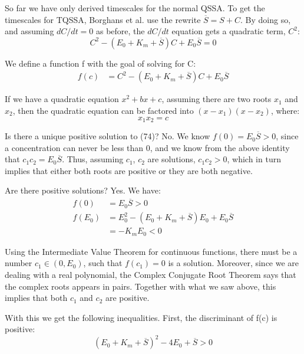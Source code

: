 \documentclass[12pt]{article}
\begin{document}
So far we have only derived timescales for the normal QSSA. To get the
timescales for TQSSA, Borghans et al. use the rewrite $\overline{S} =
S + C$. By doing so, and assuming $dC/dt=0$ as before, the $dC/dt$
equation gets a quadratic term, $C^2$:
\begin{equation}
  C^2 - (E_0 + K_m + \overline{S})C + E_0 \overline{S} = 0
\end{equation}

We define a function f with the goal of solving for C:
\begin{align}
  f(c) &= C^2 - (E_0 + K_m + \overline{S})C + E_0 \overline{S}
\end{align}

If we have a quadratic equation $x^2+bx+c$, assuming there are two
roots $x_1$ and $x_2$, then the quadratic equation can be factored
into $(x - x_1)(x - x_2)$, where:
\begin{equation}
  x_1 x_2 = c
\end{equation}

Is there a unique positive solution to (74)? No. We know $f(0) = E_0
\overline{S} > 0$, since a concentration can never be less than 0, and
we know from the above identity that $c_1 c_2 = E_0
\overline{S}$. Thus, assuming $c_1$, $c_2$ are solutions, $c_1 c_2 >
0$, which in turn implies that either both roots are positive or they
are both negative.

Are there positive solutions? Yes. We have:
\begin{align}
  f(0) &= E_0 \overline{S} > 0 \\
  f(E_0) &= E_0^2 - (E_0 + K_m + \overline{S})E_0 + E_0 \overline{S} \\
         &= - K_m E_0 < 0
\end{align}

Using the Intermediate Value Theorem for continuous functions, there
must be a number $c_1 \in (0,E_0)$, such that $f(c_1) = 0$ is a
solution. Moreover, since we are dealing with a real polynomial, the
Complex Conjugate Root Theorem says that the complex roots appears in
pairs. Together with what we saw above, this implies that both $c_1$
and $c_2$ are positive.

With this we get the following inequalities. First, the discriminant
of f(c) is positive:
\begin{equation}
  (E_0 + K_m + \overline{S})^2 - 4 E_0 + \overline{S} > 0
\end{equation}
\end{document}
